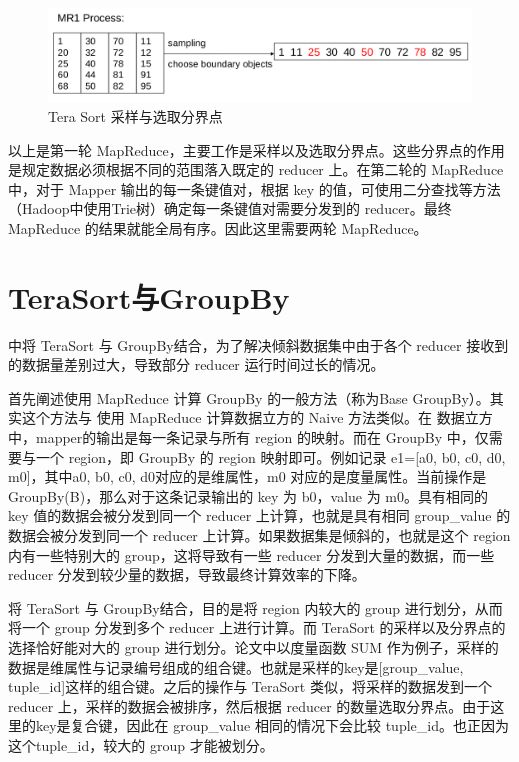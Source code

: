 \begin{figure}[!htb] 
\centering\includegraphics[width=6in]{picture/ch_terasort_mr/tera_sort_mr1} 
\caption{Tera Sort 采样与选取分界点}\label{tera_sort_mr1} 
\end{figure}

以上是第一轮 MapReduce，主要工作是采样以及选取分界点。这些分界点的作用是规定数据必须根据不同的范围落入既定的 reducer 上。在第二轮的 MapReduce 中，对于 Mapper 输出的每一条键值对，根据 key 的值，可使用二分查找等方法（Hadoop中使用Trie树）确定每一条键值对需要分发到的 reducer。最终 MapReduce 的结果就能全局有序。因此这里需要两轮 MapReduce。

\section{TeraSort与GroupBy}

\cite{tao2013minimal} 中将 TeraSort 与 GroupBy结合，为了解决倾斜数据集中由于各个 reducer 接收到的数据量差别过大，导致部分 reducer 运行时间过长的情况。

首先阐述使用 MapReduce 计算 GroupBy 的一般方法（称为Base GroupBy）。其实这个方法与 使用 MapReduce 计算数据立方的 Naive 方法类似。在 数据立方中，mapper的输出是每一条记录与所有 region 的映射。而在 GroupBy 中，仅需要与一个 region，即 GroupBy 的 region 映射即可。例如记录 e1=[a0, b0, c0, d0, m0]，其中a0, b0, c0, d0对应的是维属性，m0 对应的是度量属性。当前操作是 GroupBy(B)，那么对于这条记录输出的 key 为 b0，value 为 m0。具有相同的 key 值的数据会被分发到同一个 reducer 上计算，也就是具有相同 group\_value 的数据会被分发到同一个 reducer 上计算。如果数据集是倾斜的，也就是这个 region 内有一些特别大的 group，这将导致有一些 reducer 分发到大量的数据，而一些 reducer 分发到较少量的数据，导致最终计算效率的下降。

将 TeraSort 与 GroupBy结合，目的是将 region 内较大的 group 进行划分，从而将一个 group 分发到多个 reducer 上进行计算。而 TeraSort 的采样以及分界点的选择恰好能对大的 group 进行划分。论文中以度量函数 SUM 作为例子，采样的数据是维属性与记录编号组成的组合键。也就是采样的key是[group\_value, tuple\_id]这样的组合键。之后的操作与 TeraSort 类似，将采样的数据发到一个 reducer 上，采样的数据会被排序，然后根据 reducer 的数量选取分界点。由于这里的key是复合键，因此在 group\_value 相同的情况下会比较 tuple\_id。也正因为这个tuple\_id，较大的 group 才能被划分。

